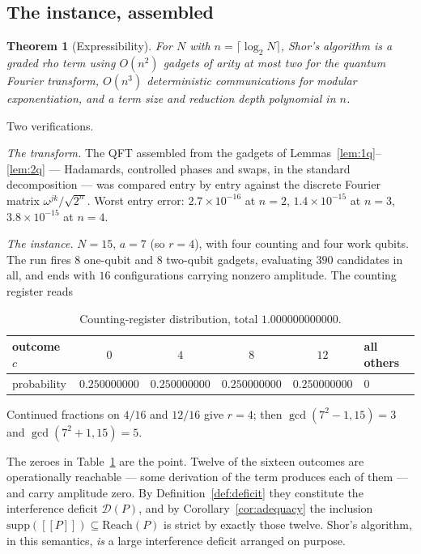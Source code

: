 \documentclass[11pt,a4paper]{article}
\theoremstyle{plain}
\newtheorem{theorem}{Theorem}[section]
\theoremstyle{definition}
\theoremstyle{remark}
\newcommand{\sem}[1]{[\![#1]\!]}
\newcommand{\Reach}{\mathrm{Reach}}
\newcommand{\supp}{\mathrm{supp}}
\begin{document}
\subsection{The instance, assembled}

\begin{theorem}[Expressibility]\label{thm:shor}
For $N$ with $n = \lceil \log_2 N\rceil$, Shor's algorithm is a graded rho term
using $O(n^2)$ gadgets of arity at most two for the quantum Fourier transform,
$O(n^3)$ deterministic communications for modular exponentiation, and a term
size and reduction depth polynomial in $n$.
\end{theorem}

Two verifications.

\emph{The transform.} The QFT assembled from the gadgets of
Lemmas~\ref{lem:1q}--\ref{lem:2q} --- Hadamards, controlled phases and swaps, in
the standard decomposition --- was compared entry by entry against the discrete
Fourier matrix $\omega^{jk}/\sqrt{2^n}$. Worst entry error: $2.7\times 10^{-16}$
at $n=2$, $1.4\times 10^{-15}$ at $n=3$, $3.8\times 10^{-15}$ at $n=4$.

\emph{The instance.} $N=15$, $a=7$ (so $r=4$), with four counting and four work
qubits. The run fires $8$ one-qubit and $8$ two-qubit gadgets, evaluating $390$
candidates in all, and ends with $16$ configurations carrying nonzero amplitude.
The counting register reads

\begin{table}[h]
\centering
\small
\begin{tabular}{@{}lccccl@{}}
\toprule
outcome $c$ & $0$ & $4$ & $8$ & $12$ & all others \\
\midrule
probability & $0.250000000$ & $0.250000000$ & $0.250000000$ & $0.250000000$ & $0$ \\
\bottomrule
\end{tabular}
\caption{Counting-register distribution, total $1.000000000000$.}\label{tab:shor}
\end{table}

\noindent
Continued fractions on $4/16$ and $12/16$ give $r = 4$; then
$\gcd(7^2-1,15) = 3$ and $\gcd(7^2+1,15) = 5$.

The zeroes in Table~\ref{tab:shor} are the point. Twelve of the sixteen outcomes
are operationally reachable --- some derivation of the term produces each of them
--- and carry amplitude zero. By Definition~\ref{def:deficit} they constitute the
interference deficit $\mathcal{D}(P)$, and by Corollary~\ref{cor:adequacy} the
inclusion $\supp(\sem{P}) \subseteq \Reach(P)$ is strict by exactly those twelve.
Shor's algorithm, in this semantics, \emph{is} a large interference deficit
arranged on purpose.
\end{document}
